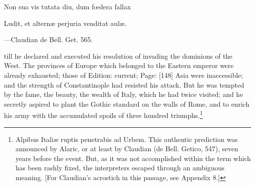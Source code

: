 {Non sua vis tutata diu, dum fœdera fallax

Ludit, et alternæ perjuria venditat aulæ.

\texthebrew{—}Claudian de Bell. Get. 565.} till he declared and executed his resolution of invading the dominions of the West. The provinces of Europe which belonged to the Eastern emperor were already exhausted; those of Edition: current; Page: [148] Asia were inaccessible; and the strength of Constantinople had resisted his attack. But he was tempted by the fame, the beauty, the wealth of Italy, which he had twice visited; and he secretly aspired to plant the Gothic standard on the walls of Rome, and to enrich his army with the accumulated spoils of three hundred triumphs.\footnote{Alpibus Italiæ ruptis penetrabis ad Urbem. This authentic prediction was announced by Alaric, or at least by Claudian (de Bell. Getico, 547), seven years before the event. But, as it was not accomplished within the term which has been rashly fixed, the interpreters escaped through an ambiguous meaning. [For Claudian\texthebrew{}’s acrostich in this passage, see Appendix 8.]}

